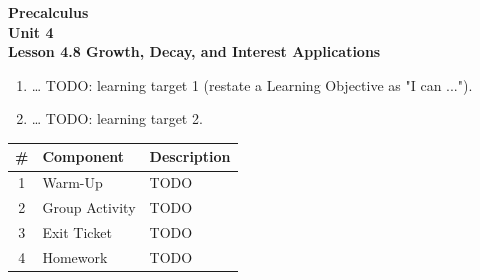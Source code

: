 \documentclass[10pt]{article}
\begin{document}
\vspace{-0.8in}

\begin{center}
  {\color{white}\textbf{\LARGE Precalculus}}\\[4pt]
  {\color{skymid}\large\textbf{Unit 4}}\\[6pt]
  {\color{white}\textbf{\large Lesson 4.8 \quad Growth, Decay, and Interest Applications}}
\end{center}

\vspace{0.22in}
\namedateperiod
\vspace{0.18in}

\begin{learningtargetbox}
\small
\begin{enumerate}[leftmargin=1.5em, itemsep=5pt]
  \item \ldots{} TODO: learning target 1 (restate a Learning Objective as "I can ...").
  \item \ldots{} TODO: learning target 2.
\end{enumerate}
\end{learningtargetbox}

\vspace{0.14in}

\begin{tocbox}
\small
\renewcommand{\arraystretch}{1.5}
\begin{tabularx}{\linewidth}{@{} c l X @{}}
\rowcolor{sky}
\textbf{\#} & \textbf{Component} & \textbf{Description} \\
\midrule
1 & Warm-Up      & TODO \\
2 & Group Activity & TODO \\
3 & Exit Ticket  & TODO \\
4 & Homework     & TODO \\
\end{tabularx}
\end{tocbox}
\end{document}
